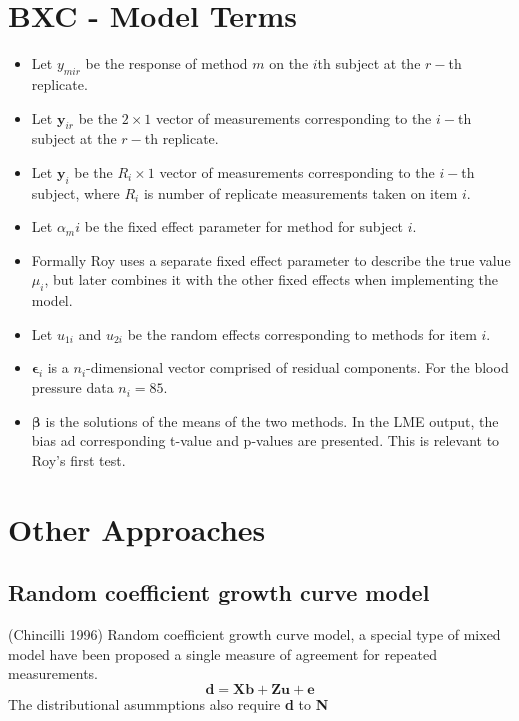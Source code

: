 \documentclass[12pt, a4paper]{report}
\theoremstyle{plain}
\theoremstyle{definition}
\theoremstyle{remark}
\begin{document}
\section{BXC - Model Terms}

\begin{itemize}
	\item Let $y_{mir}$ be the response of method $m$ on the $i$th subject
	at the $r-$th replicate.
	\item Let $\boldsymbol{y}_{ir}$ be the $2 \times 1$ vector of measurements
	corresponding to the $i-$th subject at the $r-$th replicate.
	\item Let $\boldsymbol{y}_{i}$ be the $R_i \times 1$ vector of
	measurements corresponding to the $i-$th subject, where $R_i$ is number of replicate measurements taken on item $i$.
	\item Let $\alpha_mi$ be the fixed effect parameter for method for subject $i$.
	\item Formally Roy uses a separate fixed effect parameter to describe the true value $\mu_i$, but later combines it with the other fixed effects when implementing the model.
	\item Let $u_{1i}$ and $u_{2i}$ be the random effects corresponding to methods for item $i$.
	
	\item $\boldsymbol{\epsilon}_{i}$ is a $n_{i}$-dimensional vector
	comprised of residual components. For the blood pressure data $n_{i} = 85$.
	
	\item $\boldsymbol{\beta}$ is the solutions of the means of the two methods. In the LME output, the bias ad corresponding
	t-value and p-values are presented. This is relevant to Roy's first test.\end{itemize}

\section{Other Approaches}

\subsection{Random coefficient growth curve model} (Chincilli
1996) Random coefficient growth curve model, a special type of
mixed model have been proposed a single measure of agreement for
repeated measurements.
\begin{equation}
\textbf{d}= \textbf{Xb} + \textbf{Zu} + \textbf{e}
\end{equation}
The distributional asummptions also require \textbf{d} to
\textbf{N}
\end{document}
